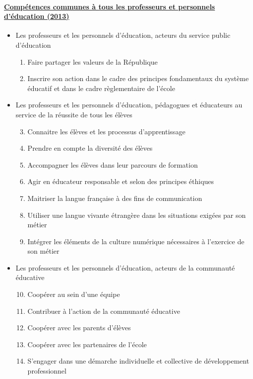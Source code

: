 \documentclass[10pt,french,twocolumn,landscape,a4paper]{article}
\begin{document}
\paragraph{\href{http://www.legifrance.gouv.fr/jopdf//jopdf/2013/0718/joe_20130718_0004.pdf}{Compétences communes à tous les professeurs et personnels d’éducation (2013)}}
\begin{itemize}
\item Les professeurs et les personnels d'éducation, acteurs du service public d'éducation
	\begin{enumerate}
	\item Faire partager les valeurs de la République
	\item Inscrire son action dans le cadre des principes fondamentaux du système éducatif et dans le cadre règlementaire de l’école
	\end{enumerate}
\item Les professeurs et les personnels d'éducation, pédagogues et éducateurs au service de la réussite de tous les élèves
	\begin{enumerate}\setcounter{enumi}{2}
	\item Connaitre les élèves et les processus d’apprentissage
	\item Prendre en compte la diversité des élèves
	\item Accompagner les élèves dans leur parcours de formation
	\item Agir en éducateur responsable et selon des principes éthiques
	\item Maitriser la langue française à des fins de communication
	\item Utiliser une langue vivante étrangère dans les situations exigées par son métier
	\item Intégrer les éléments de la culture numérique nécessaires à l’exercice de son métier
	\end{enumerate}
\item Les professeurs et les personnels d'éducation, acteurs de la communauté éducative
	\begin{enumerate}\setcounter{enumi}{9}
	\item Coopérer au sein d’une équipe
	\item Contribuer à l’action de la communauté éducative
	\item Coopérer avec les parents d’élèves
	\item Coopérer avec les partenaires de l’école
	\item S’engager dans une démarche individuelle et collective de développement professionnel
	\end{enumerate}
\end{itemize}
\end{document}
